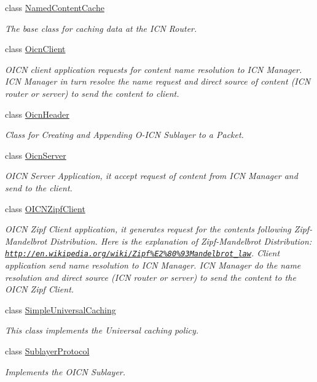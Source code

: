\begin{DoxyCompactItemize}
class \hyperlink{classns3_1_1NamedContentCache}{Named\-Content\-Cache}
\begin{DoxyCompactList}\small\item\em The base class for caching data at the I\-C\-N Router. \end{DoxyCompactList}\item 
class \hyperlink{classns3_1_1OicnClient}{Oicn\-Client}
\begin{DoxyCompactList}\small\item\em O\-I\-C\-N client application requests for content name resolution to I\-C\-N Manager. I\-C\-N Manager in turn resolve the name request and direct source of content (I\-C\-N router or server) to send the content to client. \end{DoxyCompactList}\item 
class \hyperlink{classns3_1_1OicnHeader}{Oicn\-Header}
\begin{DoxyCompactList}\small\item\em Class for Creating and Appending O-\/\-I\-C\-N Sublayer to a Packet. \end{DoxyCompactList}\item 
class \hyperlink{classns3_1_1OicnServer}{Oicn\-Server}
\begin{DoxyCompactList}\small\item\em O\-I\-C\-N Server Application, it accept request of content from I\-C\-N Manager and send to the client. \end{DoxyCompactList}\item 
class \hyperlink{classns3_1_1OICNZipfClient}{O\-I\-C\-N\-Zipf\-Client}
\begin{DoxyCompactList}\small\item\em O\-I\-C\-N Zipf Client application, it generates request for the contents following Zipf-\/\-Mandelbrot Distribution. Here is the explanation of Zipf-\/\-Mandelbrot Distribution\-: \href{http://en.wikipedia.org/wiki/Zipf%E2%80%93Mandelbrot_law}{\tt http\-://en.\-wikipedia.\-org/wiki/\-Zipf\%\-E2\%80\%93\-Mandelbrot\-\_\-law}. Client application send name resolution to I\-C\-N Manager. I\-C\-N Manager do the name resolution and direct source (I\-C\-N router or server) to send the content to the O\-I\-C\-N Zipf Client. \end{DoxyCompactList}\item 
class \hyperlink{classns3_1_1SimpleUniversalCaching}{Simple\-Universal\-Caching}
\begin{DoxyCompactList}\small\item\em This class implements the Universal caching policy. \end{DoxyCompactList}\item 
class \hyperlink{classns3_1_1SublayerProtocol}{Sublayer\-Protocol}
\begin{DoxyCompactList}\small\item\em Implements the O\-I\-C\-N Sublayer. \end{DoxyCompactList}\end{DoxyCompactItemize}
